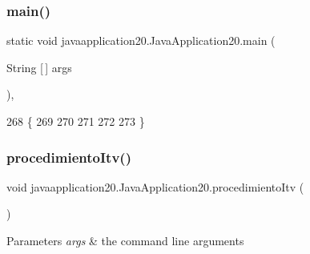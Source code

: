 \subsubsection{\texorpdfstring{main()}{main()}}
{\footnotesize\ttfamily static void javaapplication20.\+Java\+Application20.\+main (\begin{DoxyParamCaption}\item[{String \mbox{[}$\,$\mbox{]}}]{args }\end{DoxyParamCaption})\hspace{0.3cm}{\ttfamily [inline]}, {\ttfamily [static]}}


\begin{DoxyCode}
268                                            \{
269         
270         
271         
272         
273     \}
\end{DoxyCode}
\mbox{\label{classjavaapplication20_1_1_java_application20_af8de1708de71156b3c2bb28b2e3732eb}} 
\subsubsection{\texorpdfstring{procedimiento\+Itv()}{procedimientoItv()}}
{\footnotesize\ttfamily void javaapplication20.\+Java\+Application20.\+procedimiento\+Itv (\begin{DoxyParamCaption}{ }\end{DoxyParamCaption})\hspace{0.3cm}{\ttfamily [inline]}}


\begin{DoxyParams}{Parameters}
{\em args} & the command line arguments \\
\hline
\end{DoxyParams}

